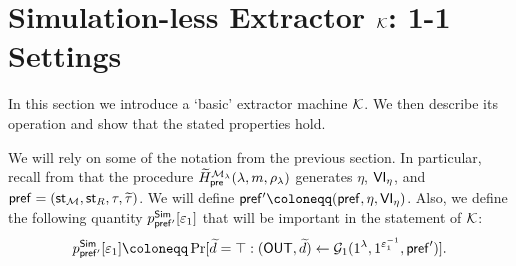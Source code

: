 
\section{Simulation-less Extractor \textnormal{$\mathcal{K}$}: 1-1 Settings}
\label{sec:simless-ext:1-1}



In this section we introduce a `basic' extractor machine $\mathcal{K}$. We then describe its operation and show that the stated properties hold. 

We will rely on some of the notation from the previous section. In particular, recall from  that the procedure $\widetilde{H}^{\mathcal{M}_\lambda}_{\mathsf{pre}}(\lambda, m, \rho_\lambda)$ generates $\eta$, $\mathsf{VI}_\eta$, and $\mathsf{pref}=(\mathsf{st}_{\mathcal{M}}, \mathsf{st}_R, \tau,\widetilde{\tau})$. We will define $\msf{pref'} \coloneqq (\msf{pref},\eta,\msf{VI}_{\eta})$. Also, we define the following quantity $p^{\mathsf{Sim}}_{\mathsf{pref'}}[\varepsilon_1]$ that will be important in the statement of $\mathcal{K}$: 
\begin{equation}\label{eq:def:p-pref}
p^{\msf{Sim}}_{\msf{pref'}}[\epsilon_1] \coloneqq \Pr[\tilde{d} = \top : (\OUT,\tilde{d}) \gets \mcal{G}_1(1^\secpar, 1^{\epsilon_1^{-1}}, \msf{pref}')].
\end{equation}

